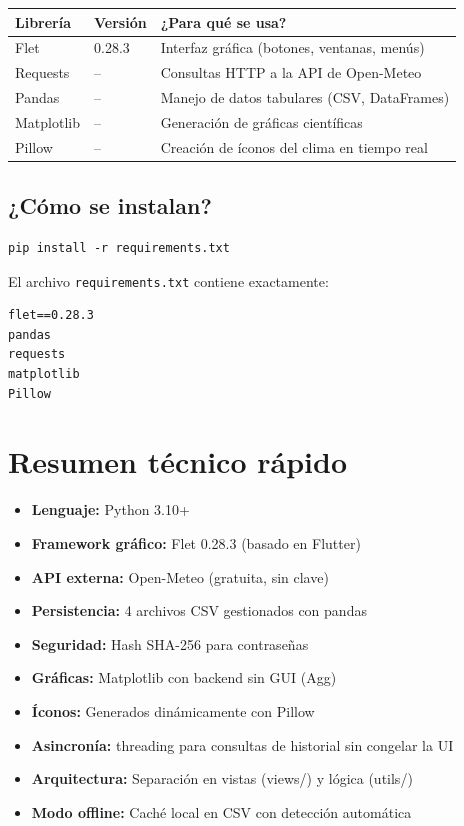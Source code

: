 \documentclass[12pt,a4paper]{article}
\begin{document}
\begin{tabular}{|l|l|l|}
\hline
\textbf{Librería} & \textbf{Versión} & \textbf{¿Para qué se usa?} \\
\hline
Flet & 0.28.3 & Interfaz gráfica (botones, ventanas, menús) \\
Requests & -- & Consultas HTTP a la API de Open-Meteo \\
Pandas & -- & Manejo de datos tabulares (CSV, DataFrames) \\
Matplotlib & -- & Generación de gráficas científicas \\
Pillow & -- & Creación de íconos del clima en tiempo real \\
\hline
\end{tabular}

\subsection*{¿Cómo se instalan?}

\begin{lstlisting}[frame=none, numbers=none, basicstyle=\ttfamily\small]
pip install -r requirements.txt
\end{lstlisting}

El archivo \texttt{requirements.txt} contiene exactamente:
\begin{lstlisting}[frame=none, numbers=none, basicstyle=\ttfamily\small]
flet==0.28.3
pandas
requests
matplotlib
Pillow
\end{lstlisting}

\section{Resumen técnico rápido}

\begin{itemize}[itemsep=4pt]
    \item \textbf{Lenguaje:} Python 3.10+
    \item \textbf{Framework gráfico:} Flet 0.28.3 (basado en Flutter)
    \item \textbf{API externa:} Open-Meteo (gratuita, sin clave)
    \item \textbf{Persistencia:} 4 archivos CSV gestionados con pandas
    \item \textbf{Seguridad:} Hash SHA-256 para contraseñas
    \item \textbf{Gráficas:} Matplotlib con backend sin GUI (Agg)
    \item \textbf{Íconos:} Generados dinámicamente con Pillow
    \item \textbf{Asincronía:} threading para consultas de historial sin congelar la UI
    \item \textbf{Arquitectura:} Separación en vistas (views/) y lógica (utils/)
    \item \textbf{Modo offline:} Caché local en CSV con detección automática
\end{itemize}
\end{document}
